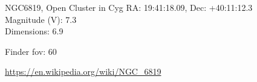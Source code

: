 \begin{block}{NGC6819, Open Cluster in Cyg}
    RA: 19:41:18.09, Dec: +40:11:12.3 \\ 
    Magnitude (V): 7.3 \\ 
    Dimensions: 6.9 

    Finder fov: 60 

    \url{https://en.wikipedia.org/wiki/NGC_6819} 
\end{block}